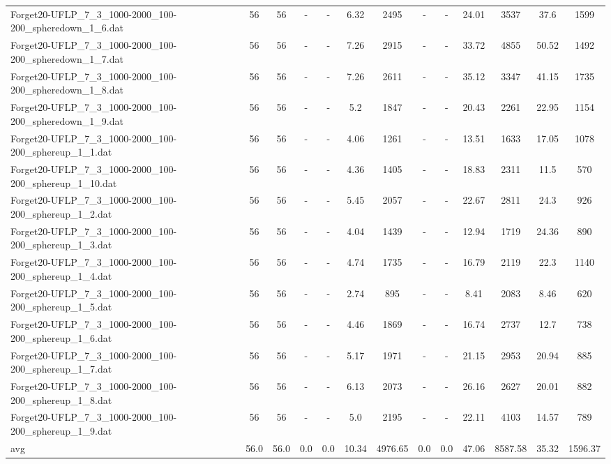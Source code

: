 \begin{table}[!ht]
{\begin{tabular}{lcccccccccccc}
Forget20-UFLP\_7\_3\_1000-2000\_100-200\_spheredown\_1\_6.dat & 56 & 56 &  - &  - & 6.32 & 2495 &  - &  - & 24.01 & 3537 & 37.6 & 1599 \\
Forget20-UFLP\_7\_3\_1000-2000\_100-200\_spheredown\_1\_7.dat & 56 & 56 &  - &  - & 7.26 & 2915 &  - &  - & 33.72 & 4855 & 50.52 & 1492 \\
Forget20-UFLP\_7\_3\_1000-2000\_100-200\_spheredown\_1\_8.dat & 56 & 56 &  - &  - & 7.26 & 2611 &  - &  - & 35.12 & 3347 & 41.15 & 1735 \\
Forget20-UFLP\_7\_3\_1000-2000\_100-200\_spheredown\_1\_9.dat & 56 & 56 &  - &  - & 5.2 & 1847 &  - &  - & 20.43 & 2261 & 22.95 & 1154 \\
Forget20-UFLP\_7\_3\_1000-2000\_100-200\_sphereup\_1\_1.dat & 56 & 56 &  - &  - & 4.06 & 1261 &  - &  - & 13.51 & 1633 & 17.05 & 1078 \\
Forget20-UFLP\_7\_3\_1000-2000\_100-200\_sphereup\_1\_10.dat & 56 & 56 &  - &  - & 4.36 & 1405 &  - &  - & 18.83 & 2311 & 11.5 & 570 \\
Forget20-UFLP\_7\_3\_1000-2000\_100-200\_sphereup\_1\_2.dat & 56 & 56 &  - &  - & 5.45 & 2057 &  - &  - & 22.67 & 2811 & 24.3 & 926 \\
Forget20-UFLP\_7\_3\_1000-2000\_100-200\_sphereup\_1\_3.dat & 56 & 56 &  - &  - & 4.04 & 1439 &  - &  - & 12.94 & 1719 & 24.36 & 890 \\
Forget20-UFLP\_7\_3\_1000-2000\_100-200\_sphereup\_1\_4.dat & 56 & 56 &  - &  - & 4.74 & 1735 &  - &  - & 16.79 & 2119 & 22.3 & 1140 \\
Forget20-UFLP\_7\_3\_1000-2000\_100-200\_sphereup\_1\_5.dat & 56 & 56 &  - &  - & 2.74 & 895 &  - &  - & 8.41 & 2083 & 8.46 & 620 \\
Forget20-UFLP\_7\_3\_1000-2000\_100-200\_sphereup\_1\_6.dat & 56 & 56 &  - &  - & 4.46 & 1869 &  - &  - & 16.74 & 2737 & 12.7 & 738 \\
Forget20-UFLP\_7\_3\_1000-2000\_100-200\_sphereup\_1\_7.dat & 56 & 56 &  - &  - & 5.17 & 1971 &  - &  - & 21.15 & 2953 & 20.94 & 885 \\
Forget20-UFLP\_7\_3\_1000-2000\_100-200\_sphereup\_1\_8.dat & 56 & 56 &  - &  - & 6.13 & 2073 &  - &  - & 26.16 & 2627 & 20.01 & 882 \\
Forget20-UFLP\_7\_3\_1000-2000\_100-200\_sphereup\_1\_9.dat & 56 & 56 &  - &  - & 5.0 & 2195 &  - &  - & 22.11 & 4103 & 14.57 & 789 \\
\hline avg & 56.0 & 56.0 & 0.0& 0.0 & 10.34& 4976.65 & 0.0& 0.0 & 47.06& 8587.58 & 35.32& 1596.37\\ \hline

\end{tabular}}
\end{table}
